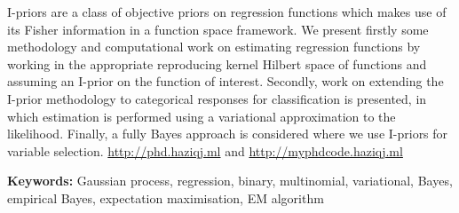 I-priors are a class of objective priors on regression functions which makes use of its Fisher information in a function space framework. 
We present firstly some methodology and computational work on estimating regression functions by working in the appropriate reproducing kernel Hilbert space of functions and assuming an I-prior on the function of interest. 
Secondly, work on extending the I-prior methodology to categorical responses for classification is presented, in which estimation is performed using a variational approximation to the likelihood. 
Finally, a fully Bayes approach is considered where we use I-priors for variable selection.
\url{http://phd.haziqj.ml} and \url{http://myphdcode.haziqj.ml}

{\noindent\textbf{Keywords:} 
	Gaussian process, regression, binary, multinomial, variational, Bayes, empirical Bayes, expectation maximisation, EM algorithm
}